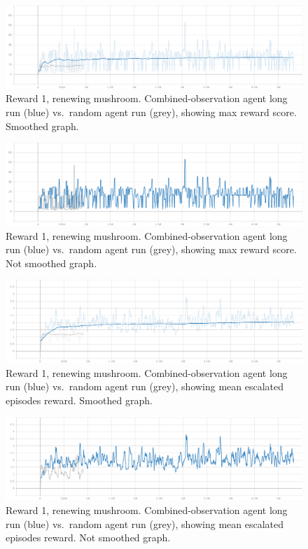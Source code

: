 \documentclass[]{article}
\begin{document}
\begin{figure}
\centering
\includegraphics{./img/114084904-f9f23c00-98b0-11eb-9dc2-b08e4751a74f.png}
\caption{Reward 1, renewing mushroom. Combined-observation agent long
run (blue) vs.~random agent run (grey), showing max reward score.
Smoothed graph.}
\end{figure}

\begin{figure}
\centering
\includegraphics{./img/114084936-02e30d80-98b1-11eb-82b6-87b116a9bbd9.png}
\caption{Reward 1, renewing mushroom. Combined-observation agent long
run (blue) vs.~random agent run (grey), showing max reward score. Not
smoothed graph.}
\end{figure}

\begin{figure}
\centering
\includegraphics{./img/114084741-d0391500-98b0-11eb-9f85-bd11e5a799ae.png}
\caption{Reward 1, renewing mushroom. Combined-observation agent long
run (blue) vs.~random agent run (grey), showing mean escalated episodes
reward. Smoothed graph.}
\end{figure}

\begin{figure}
\centering
\includegraphics{./img/114084805-df1fc780-98b0-11eb-802c-6eb2f5d671f0.png}
\caption{Reward 1, renewing mushroom. Combined-observation agent long
run (blue) vs.~random agent run (grey), showing mean escalated episodes
reward. Not smoothed graph.}
\end{figure}
\end{document}

